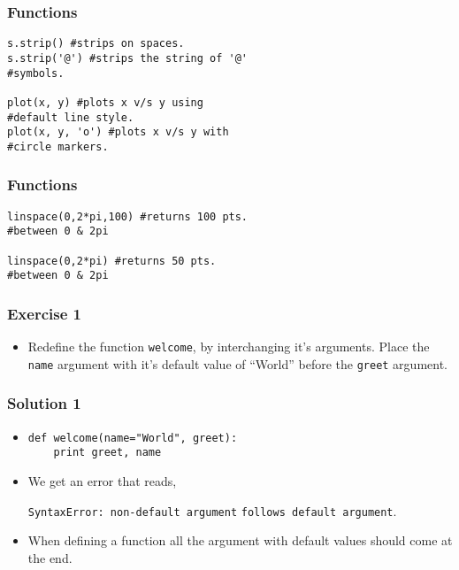 \documentclass[17pt,compress]{beamer}
\begin{document}
\begin{frame}[fragile]
\frametitle{Functions}
\label{sec-4.1}

\lstset{language=Python}
\begin{small}
\begin{lstlisting}
s.strip() #strips on spaces. 
s.strip('@') #strips the string of '@' 
#symbols.

plot(x, y) #plots x v/s y using 
#default line style. 
plot(x, y, 'o') #plots x v/s y with 
#circle markers. 
\end{lstlisting}
\end{small}
\end{frame}
\begin{frame}[fragile]
\frametitle{Functions}
\label{sec-4.2}

\lstset{language=Python}
\begin{small}
\begin{lstlisting}
linspace(0,2*pi,100) #returns 100 pts. 
#between 0 & 2pi

linspace(0,2*pi) #returns 50 pts. 
#between 0 & 2pi
\end{lstlisting}
\end{small}
\end{frame}
\begin{frame}
\frametitle{Exercise 1}
\label{sec-5}

\begin{itemize}
\item Redefine the function \texttt{welcome}, by interchanging it's
  arguments.\pause
\vspace{3pt}  
  Place the \texttt{name} argument with it's default value of
  ``World'' before the \texttt{greet} argument.
\end{itemize}
\end{frame}
\begin{frame}[fragile]
\frametitle{Solution 1}
\label{sec-6}
\begin{itemize}
\item 
\lstset{language=Python}
\begin{small}
\begin{lstlisting}
def welcome(name="World", greet):
    print greet, name
\end{lstlisting}
\end{small}\pause
\item  We get an error that reads, \\
  \begin{small}
  \verb~SyntaxError: non-default argument~
  \verb~follows default argument~.
  \end{small}\pause
\item When defining a function all the
  argument with default values should come at the end.

\end{itemize}
\end{frame}
\end{document}
